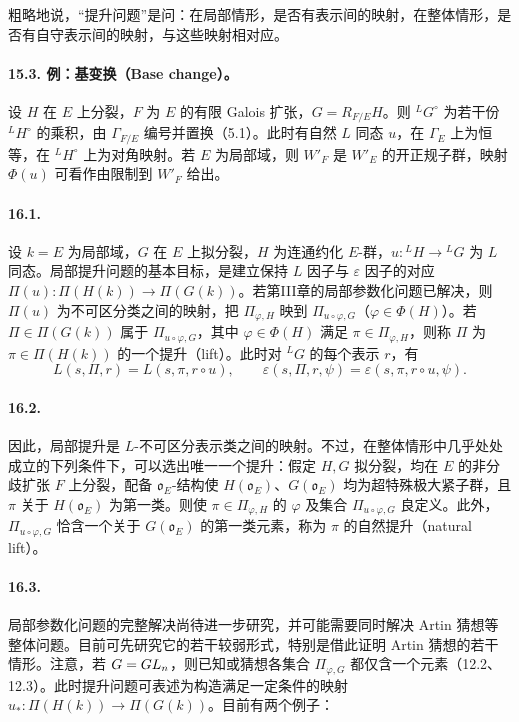 粗略地说，“提升问题”是问：在局部情形，是否有表示间的映射，在整体情形，是否有自守表示间的映射，与这些映射相对应。

\paragraph*{15.3. 例：基变换（Base change）。}
设 $H$ 在 $E$ 上分裂，$F$ 为 $E$ 的有限 Galois 扩张，$G=R_{F/E}H$。则 ${}^LG^\circ$ 为若干份 ${}^LH^\circ$ 的乘积，由 $\Gamma_{F/E}$ 编号并置换（5.1）。此时有自然 $L$ 同态 $u$，在 $\Gamma_E$ 上为恒等，在 ${}^LH^\circ$ 上为对角映射。若 $E$ 为局部域，则 $W'_F$ 是 $W'_E$ 的开正规子群，映射 $\Phi(u)$ 可看作由限制到 $W'_F$ 给出。

\paragraph*{16.1.} 设 $k=E$ 为局部域，$G$ 在 $E$ 上拟分裂，$H$ 为连通约化 $E$-群，$u:{}^LH\to{}^LG$ 为 $L$ 同态。局部提升问题的基本目标，是建立保持 $L$ 因子与 $\varepsilon$ 因子的对应 $\Pi(u):\Pi(H(k))\to\Pi(G(k))$。若第III章的局部参数化问题已解决，则 $\Pi(u)$ 为不可区分类之间的映射，把 $\Pi_{\varphi,H}$ 映到 $\Pi_{u\circ\varphi,G}$（$\varphi\in\Phi(H)$）。若 $\Pi\in\Pi(G(k))$ 属于 $\Pi_{u\circ\varphi,G}$，其中 $\varphi\in\Phi(H)$ 满足 $\pi\in\Pi_{\varphi,H}$，则称 $\Pi$ 为 $\pi\in\Pi(H(k))$ 的一个提升（lift）。此时对 ${}^LG$ 的每个表示 $r$，有
\begin{equation}
 L(s,\Pi,r)=L(s,\pi,r\circ u),\qquad
 \varepsilon(s,\Pi,r,\psi)=\varepsilon(s,\pi,r\circ u,\psi).\tag{1}
\end{equation}

\paragraph*{16.2.} 因此，局部提升是 $L$-不可区分表示类之间的映射。不过，在整体情形中几乎处处成立的下列条件下，可以选出唯一一个提升：假定 $H,G$ 拟分裂，均在 $E$ 的非分歧扩张 $F$ 上分裂，配备 $\mathfrak o_E$-结构使 $H(\mathfrak o_E)$、$G(\mathfrak o_E)$ 均为超特殊极大紧子群，且 $\pi$ 关于 $H(\mathfrak o_E)$ 为第一类。则使 $\pi\in\Pi_{\varphi,H}$ 的 $\varphi$ 及集合 $\Pi_{u\circ\varphi,G}$ 良定义。此外，$\Pi_{u\circ\varphi,G}$ 恰含一个关于 $G(\mathfrak o_E)$ 的第一类元素，称为 $\pi$ 的自然提升（natural lift）。

\paragraph*{16.3.} 局部参数化问题的完整解决尚待进一步研究，并可能需要同时解决 Artin 猜想等整体问题。目前可先研究它的若干较弱形式，特别是借此证明 Artin 猜想的若干情形。注意，若 $G=GL_n$，则已知或猜想各集合 $\Pi_{\varphi,G}$ 都仅含一个元素（12.2、12.3）。此时提升问题可表述为构造满足一定条件的映射 $u_*:\Pi(H(k))\to\Pi(G(k))$。目前有两个例子：

